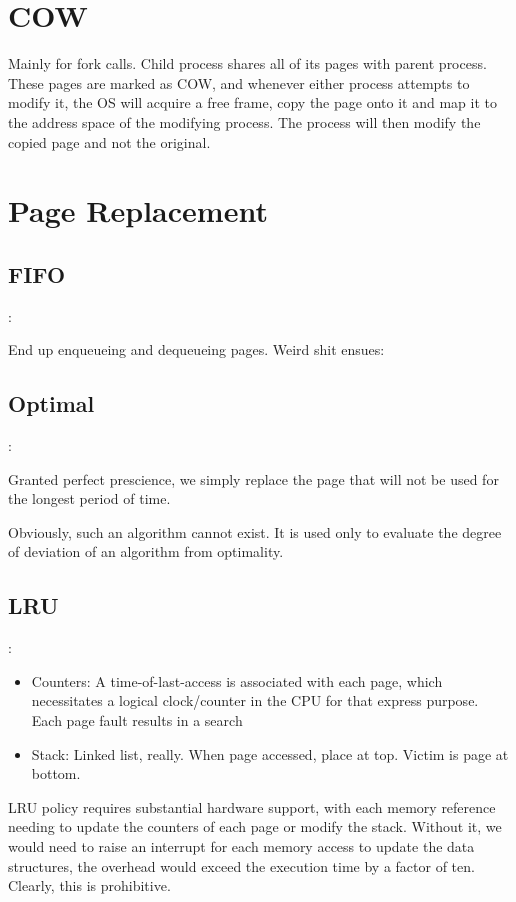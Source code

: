 \documentclass{amsart}
\begin{document}
    \section{COW}
        Mainly for fork calls. Child process shares all of its pages with parent process. These pages are marked as COW, and whenever either process attempts to modify it, the OS will acquire a free frame, copy the page onto it and map it to the address space of the modifying process. The process will then modify the copied page and not the original.

    \section{Page Replacement} 

    \subsection{FIFO}:

    End up enqueueing and dequeueing pages. Weird shit ensues:


    \subsection{Optimal}:

    Granted perfect prescience, we simply replace the page that will not be used for the longest period of time.

    Obviously, such an algorithm cannot exist. It is used only to evaluate the degree of deviation of an algorithm from optimality.

    \subsection{LRU}:


    \begin{itemize}
        \item Counters: A time-of-last-access is associated with each page, which necessitates a logical clock/counter in the CPU for that express purpose. Each page fault results in a search
        \item Stack: Linked list, really. When page accessed, place at top. Victim is page at bottom.
    \end{itemize}
    LRU policy requires substantial hardware support, with each memory reference needing to update the counters of each page or modify the stack.
    Without it, we would need to raise an interrupt for each memory access to update the data structures, the overhead would exceed the execution time by a factor of ten. Clearly, this is prohibitive.
\end{document}
